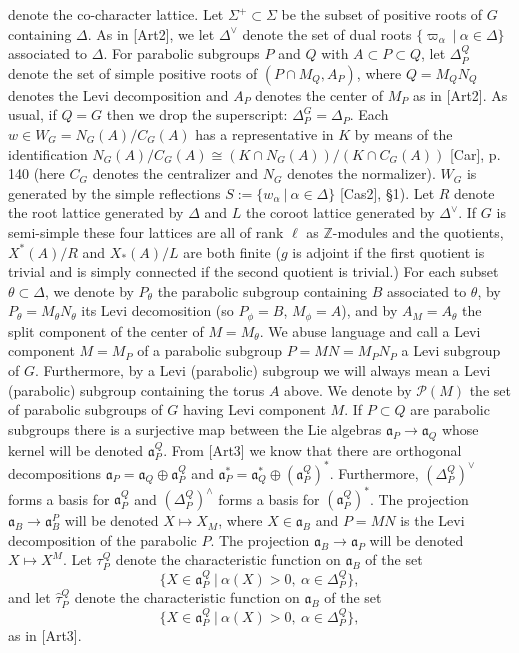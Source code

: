 \documentclass[12pt]{article}
\begin{document}
denote the co-character lattice. Let $\Sigma^+\subset\Sigma$ be the subset of positive roots of $G$ containing $\Delta$. As in [Art2], we let $\Delta^\vee$ denote the set of dual roots $\{\varpi_\alpha\ |\ \alpha\in\Delta\}$ associated to $\Delta$. For parabolic subgroups $P$ and $Q$ with $A\subset P\subset Q$, let $\Delta_P^Q$ denote the set of simple positive roots of $(P\cap M_Q,A_P)$, where $Q=M_QN_Q$ denotes the Levi decomposition and $A_P$ denotes the center of $M_P$ as in [Art2]. As usual, if $Q=G$ then we drop the superscript: $\Delta_P^G=\Delta_P$. Each $w\in W_G=N_G(A)/C_G(A)$ has a representative in $K$ by means of the identification $N_G(A)/C_G(A)\cong(K\cap N_G(A))/(K\cap C_G(A))$ [Car], p. 140 (here $C_G$ denotes the centralizer and $N_G$ denotes the normalizer). $W_G$ is generated by the simple reflections $S:=\{w_\alpha\ |\ \alpha\in\Delta\}$ [Cas2], \S1). Let $R$ denote the root lattice generated by $\Delta$ and $L$ the coroot lattice generated by $\Delta^\vee$. If $G$ is semi-simple these four lattices are all of rank $\ell$ as $\mathbb{Z}$-modules and the quotients, $X^*(A)/R$ and $X_*(A)/L$ are both finite ($g$ is adjoint if the first quotient is trivial and is simply connected if the second quotient is trivial.) For each subset $\theta\subset\Delta$, we denote by $P_\theta$ the parabolic subgroup containing $B$ associated to $\theta$, by $P_\theta=M_\theta N_\theta$ its Levi decomosition (so $P_\phi=B$, $M_\phi=A$), and by $A_M=A_\theta$ the split component of the center of $M=M_\theta$. We abuse language and call a Levi component $M=M_P$ of a parabolic subgroup $P=MN=M_PN_P$ a Levi subgroup of $G$. Furthermore, by a Levi (parabolic) subgroup we will always mean a Levi (parabolic) subgroup containing the torus $A$ above. We denote by $\mathcal{P}(M)$ the set of parabolic subgroups of $G$ having Levi component $M$. If $P\subset Q$ are parabolic subgroups there is a surjective map between the Lie algebras $\mathfrak{a}_P\rightarrow\mathfrak{a}_Q$ whose kernel will be denoted $\mathfrak{a}_P^Q$. From [Art3] we know that there are orthogonal decompositions $\mathfrak{a}_P=\mathfrak{a}_Q\oplus\mathfrak{a}_P^Q$ and $\mathfrak{a}_P^*=\mathfrak{a}_Q^*\oplus(\mathfrak{a}_P^Q)^*$. Furthermore, $(\Delta_P^Q)^\vee$ forms a basis for $\mathfrak{a}_P^Q$ and $(\Delta_P^Q)^\wedge$ forms a basis for $(\mathfrak{a}_P^Q)^*$. The projection $\mathfrak{a}_B\rightarrow\mathfrak{a}_B^P$ will be denoted $X\longmapsto X_M$, where $X\in\mathfrak{a}_B$ and $P=MN$ is the Levi decomposition of the parabolic $P$. The projection $\mathfrak{a}_B\rightarrow\mathfrak{a}_P$ will be denoted $X\longmapsto X^M$. Let $\tau_P^Q$ denote the characteristic function on $\mathfrak{a}_B$ of the set
\[
\{X\in\mathfrak{a}_P^Q\ |\ \alpha(X)>0,\ \alpha\in\Delta_P^Q\},
\]
and let $\hat\tau_P^Q$ denote the characteristic function on $\mathfrak{a}_B$ of the set
\[
\{X\in\mathfrak{a}_P^Q\ |\ \alpha(X)>0,\ \alpha\in\Delta_P^Q\},
\]
as in [Art3].
\end{document}
